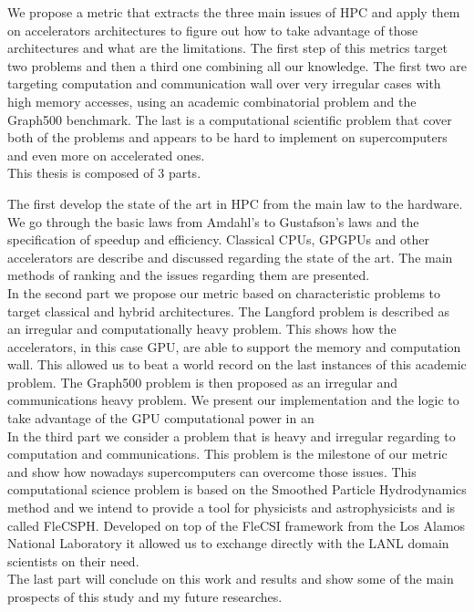 We propose a metric that extracts the three main issues of HPC and apply them on accelerators architectures to figure out how to take advantage of those architectures and what are the limitations. 
The first step of this metrics target two problems and then a third one combining all our knowledge.
The first two are targeting computation and communication wall over very irregular cases with high memory accesses, using an academic combinatorial problem and the Graph500 benchmark. 
The last is a computational scientific problem that cover both of the problems and appears to be hard to implement on supercomputers and even more on accelerated ones.\\

This thesis is composed of 3 parts.

The first develop the state of the art in HPC from the main law to the hardware. 	
We go through the basic laws from Amdahl's to Gustafson's laws and the specification of speedup and efficiency.
Classical CPUs, GPGPUs and other accelerators are describe and discussed regarding the state of the art. 
The main methods of ranking and the issues regarding them are presented.\\ 

In the second part we propose our metric based on characteristic problems to target classical and hybrid architectures.
The Langford problem is described as an irregular and computationally heavy problem.
This shows how the accelerators, in this case GPU, are able to support the memory and computation wall. 
This allowed us to beat a world record on the last instances of this academic problem.
The Graph500 problem is then proposed as an irregular and communications heavy problem. 
We present our implementation and the logic to take advantage of the GPU computational power in an \\

In the third part we consider a problem that is heavy and irregular regarding to computation and communications.
This problem is the milestone of our metric and show how nowadays supercomputers can overcome those issues. 
This computational science problem is based on the Smoothed Particle Hydrodynamics method and we intend to provide a tool for physicists and astrophysicists and is called FleCSPH. 
Developed on top of the FleCSI framework from the Los Alamos National Laboratory it allowed us to exchange directly with the LANL domain scientists on their need.\\

The last part will conclude on this work and results and show some of the main prospects of this study and my future researches. 